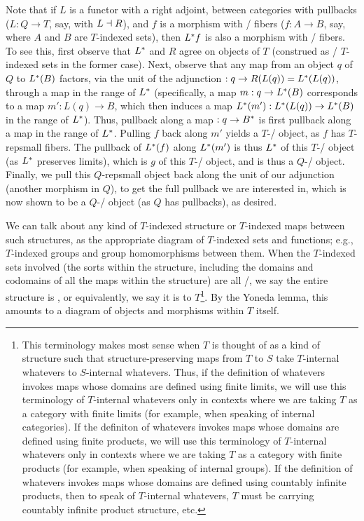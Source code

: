 Note that if $L$ is a functor with a right adjoint, between categories with pullbacks ($L : Q \to T$, say, with $L \dashv R$), and $f$ is a morphism with \repsmall/ fibers ($f : A \to B$, say, where $A$ and $B$ are $T$-indexed sets), then $L^* f$ is also a morphism with \repsmall/ fibers. To see this, first observe that $L^*$ and $R$ agree on objects of $T$ (construed as \repsmall/ $T$-indexed sets in the former case). Next, observe that any map from an object $q$ of $Q$ to $L^*(B)$ factors, via the unit of the adjunction $: q \to R(L(q)) = L^*(L(q))$, through a map in the range of $L^*$ (specifically, a map $m: q \to L^*(B)$ corresponds to a map $m': L(q) \to B$, which then induces a map $L^*(m'): L^*(L(q)) \to L^*(B)$ in the range of $L^*$). Thus, pullback along a map $: q \to B^*$ is first pullback along a map in the range of $L^*$. Pulling $f$ back along $m'$ yields a $T$-\repsmall/ object, as $f$ has $T$-repsmall fibers. The pullback of $L^*(f)$ along $L^*(m')$ is thus $L^*$ of this $T$-\repsmall/ object (as $L^*$ preserves limits), which is $g$ of this $T$-\repsmall/ object, and is thus a $Q$-\repsmall/ object. Finally, we pull this $Q$-repsmall object back along the unit of our adjunction (another morphism in $Q$), to get the full pullback we are interested in, which is now shown to be a $Q$-\repsmall/ object (as $Q$ has pullbacks), as desired. 

We can talk about any kind of $T$-indexed structure or $T$-indexed maps between such structures, as the appropriate diagram of $T$-indexed sets and functions; e.g., $T$-indexed groups and group homomorphisms between them. When the $T$-indexed sets involved (the sorts within the structure, including the domains and codomains of all the maps within the structure) are all \repsmall/, we say the entire structure is , or equivalently, we say it is  to $T$\footnote{This  terminology makes most sense when $T$ is thought of as a kind of structure such that structure-preserving maps from $T$ to $S$ take $T$-internal whatevers to $S$-internal whatevers. Thus, if the definition of whatevers invokes maps whose domains are defined using finite limits, we will use this terminology of $T$-internal whatevers only in contexts where we are taking $T$ as a category with finite limits (for example, when speaking of internal categories). If the definiton of whatevers invokes maps whose domains are defined using finite products, we will use this terminology of $T$-internal whatevers only in contexts where we are taking $T$ as a category with finite products (for example, when speaking of internal groups). If the definition of whatevers invokes maps whose domains are defined using countably infinite products, then to speak of $T$-internal whatevers, $T$ must be carrying countably infinite product structure, etc.}. By the Yoneda lemma, this amounts to a diagram of objects and morphisms within $T$ itself.

